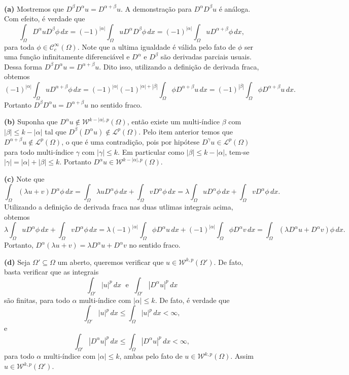 \documentclass[a4paper, 11pt]{book}
\theoremstyle{definition}
\newcommand{\cC}{\mathcal{C}}
\newcommand{\cL}{\mathcal{L}}
\newcommand{\cW}{\mathcal{W}}
\begin{document}
\begin{prf}
    ~

    \textbf{(a)} Mostremos que $D^{\beta}D^{\alpha} u = D^{\alpha + \beta}u$.
    A demonstração para $D^{\alpha}D^{\beta} u$ é análoga.
    Com efeito, é verdade que
    \[
        \int_\Omega D^{\alpha} u D^{\beta} \phi \, dx = (-1)^{|\alpha|} \int_\Omega u D^{\alpha} D^{\beta} \phi \, dx = (-1)^{|\alpha|} \int_\Omega u D^{\alpha + \beta} \phi \,dx,
    \]
    para toda $\phi \in \cC^{\infty}_c(\Omega)$. Note que a ultima igualdade é válida pelo fato de $\phi$ ser uma função infinitamente diferenciável e $D^\alpha$ e $D^\beta$ são derivadas parciais usuais.
    Dessa forma $D^{\beta}D^{\alpha} u = D^{\alpha + \beta} u$.
    Dito isso, utilizando a definição de derivada fraca, obtemos
    \[
        (-1)^{|\alpha|} \int_\Omega u D^{\alpha + \beta} \phi \,dx = (-1)^{|\alpha|}(-1)^{|\alpha| + |\beta|} \int_\Omega \phi D^{\alpha+\beta} u \,dx = (-1)^{|\beta|} \int_\Omega \phi D^{\alpha + \beta} u \,dx.
    \]
    Portanto $D^{\beta} D^{\alpha} u = D^{\alpha + \beta} u$ no sentido fraco.

    \textbf{(b)} Suponha que $D^\alpha u \not\in \cW^{k-|\alpha|,p}(\Omega)$, então existe um multi-índice $\beta$ com $|\beta| \leqslant k - |\alpha|$ tal que $D^{\beta}(D^{\alpha}u) \not\in \cL^p(\Omega)$.
    Pelo item anterior temos que $D^{\alpha+\beta}u \not\in \cL^p(\Omega)$, o que é uma contradição, pois por hipótese $D^{\gamma}u \in \cL^p(\Omega)$ para todo multi-índice $\gamma$ com $|\gamma| \leqslant k$. Em particular como $|\beta| \leqslant k - |\alpha|$, tem-se $|\gamma| = |\alpha| + |\beta| \leqslant k$.
    Portanto $D^{\alpha}u \in \cW^{k-|\alpha|,p}(\Omega)$.

    \textbf{(c)} Note que
    \[
        \int_\Omega (\lambda u + v) D^{\alpha}\phi \,dx = \int_\Omega \lambda u D^\alpha \phi \, dx + \int_\Omega v D^\alpha \phi \, dx = \lambda \int_\Omega u D^{\alpha} \phi \,dx + \int_\Omega v D^{\alpha} \phi \, dx.
    \]
    Utilizando a definição de derivada fraca nas duas utlimas integrais acima, obtemos
    {\small
    \[
        \lambda \int_\Omega u D^{\alpha} \phi \,dx + \int_\Omega v D^{\alpha} \phi \, dx = \lambda (-1)^{|\alpha|} \int_\Omega \phi D^{\alpha} u \, dx + (-1)^{|\alpha|}\int_\Omega \phi D^{\alpha} v \, dx = \int_\Omega (\lambda D^{\alpha}u + D^{\alpha}v )\phi \,dx.
    \]}\!
    Portanto, $D^{\alpha}(\lambda u + v) = \lambda D^\alpha u + D^\alpha v$ no sentido fraco.

    \textbf{(d)} Seja $\Omega' \subseteq \Omega$ um aberto, queremos verificar que $u \in \cW^{k,p}(\Omega')$.
    De fato, basta verificar que as integrais
    \[
        \int_{\Omega'} |u|^p \, dx \;\text{ e }\; \int_{\Omega'} |D^{\alpha}u|^p \, dx
    \]
    são finitas, para todo $\alpha$ multi-índice com $|\alpha| \leqslant k$. De fato, é verdade que
    \[
        \int_{\Omega'} |u|^p \, dx \leqslant \int_{\Omega} |u|^p \,dx < \infty,
    \]
    e
    \[
        \int_{\Omega'} |D^\alpha u|^p \, dx \leqslant \int_{\Omega} |D^\alpha u|^p \,dx < \infty,
    \]
    para todo $\alpha$ multi-índice com $|\alpha| \leqslant k$, ambas pelo fato de $u \in \cW^{k,p}(\Omega)$.
    Assim $u \in \cW^{k,p}(\Omega')$.


\end{prf}
\end{document}

